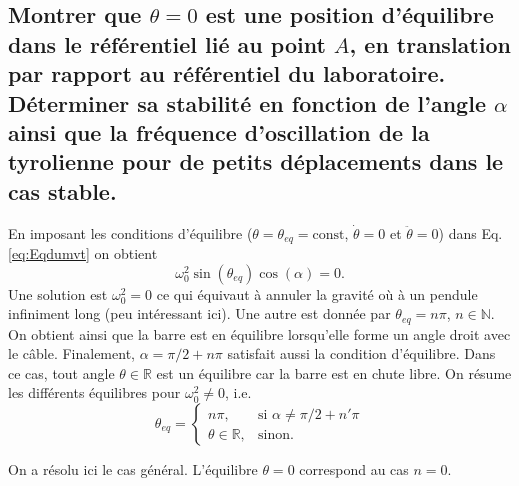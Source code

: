 \documentclass[11pt,a4paper]{exam}
\begin{document}
\begin{parts}
\part{Montrer que $\theta=0$ est une position d'équilibre dans le référentiel lié au point $A$, en translation par rapport au référentiel du laboratoire.
Déterminer sa stabilité en fonction de l'angle $\alpha$ ainsi que la fréquence d'oscillation de la tyrolienne pour de petits déplacements dans le cas stable.}
    \par\vspace{2mm}
    En imposant les conditions d'équilibre ($\theta = \theta_{eq} = \textrm{const}$, $\dot \theta = 0 $ et $\ddot \theta = 0$) dans Eq. \eqref{eq:Eqdumvt} on obtient
    \begin{equation}
         \omega_0^2 \sin(\theta_{eq}) \cos(\alpha)  = 0. \label{eq:thetaeq}
    \end{equation}
    Une solution est $\omega_0^2 =0$ ce qui équivaut à annuler la gravité o\`u à un pendule infiniment long (peu intéressant ici).
    Une autre est donnée par $\theta_{eq}=n\pi$, $n \in \mathbb N$. 
    On obtient ainsi que la barre est en équilibre lorsqu'elle forme un angle droit avec le câble.
    Finalement, $\alpha=\pi/2+n\pi$ satisfait aussi la condition d'équilibre.
    Dans ce cas, tout angle $\theta \in \mathbb R$ est un équilibre car la barre est en chute libre.
    On résume les différents équilibres pour $\omega_0^2\neq 0$, i.e.
    \begin{equation}
        \theta_{eq}= 
    \begin{cases}
        n\pi,& \text{si } \alpha\neq\pi/2 + n'\pi\\
        \theta\in\mathbb R, & \text{sinon}.
    \end{cases}
    \label{eq:thetaeqs}
    \end{equation}
    
    On a résolu ici le cas général. 
    L'équilibre $\theta=0$ correspond au cas $n=0$.
    

\end{parts}
\end{document}
